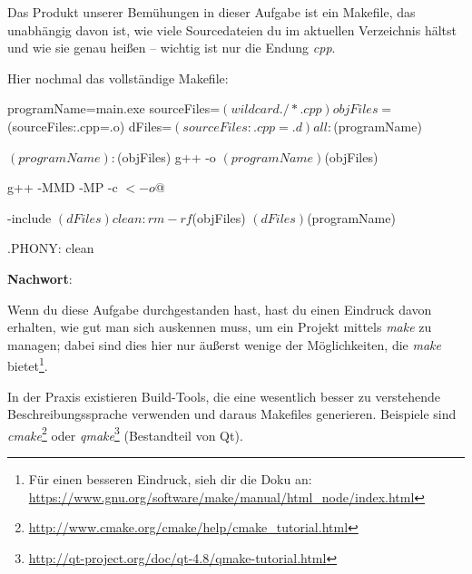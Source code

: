 Das Produkt unserer Bemühungen in dieser Aufgabe ist ein Makefile, das unabhängig davon ist, wie viele Sourcedateien du im aktuellen Verzeichnis hältst und wie sie genau heißen -- wichtig ist nur die Endung \emph{cpp}.

Hier nochmal das vollständige Makefile:
\begin{lstmake}
programName=main.exe
sourceFiles=$(wildcard ./*.cpp)
objFiles=$(sourceFiles:.cpp=.o)
dFiles=$(sourceFiles:.cpp=.d)

all: $(programName)

$(programName): $(objFiles)
	g++ -o $(programName) $(objFiles)

	g++ -MMD -MP -c $< -o $@

-include $(dFiles)

clean:
	rm -rf $(objFiles) $(dFiles) $(programName)

.PHONY: clean
\end{lstmake}

\textbf{Nachwort}:

Wenn du diese Aufgabe durchgestanden hast, hast du einen Eindruck davon erhalten, wie gut man sich auskennen muss, um ein Projekt mittels \emph{make} zu managen;
dabei sind dies hier nur äußerst wenige der Möglichkeiten, die \emph{make} bietet\footnote{Für einen besseren Eindruck, sieh dir die Doku an: \url{https://www.gnu.org/software/make/manual/html_node/index.html}}.

In der Praxis existieren Build-Tools, die eine wesentlich besser zu verstehende Beschreibungssprache verwenden und daraus Makefiles generieren.
Beispiele sind \emph{cmake}\footnote{\url{http://www.cmake.org/cmake/help/cmake_tutorial.html}} oder \emph{qmake}\footnote{\url{http://qt-project.org/doc/qt-4.8/qmake-tutorial.html}} (Bestandteil von Qt).



